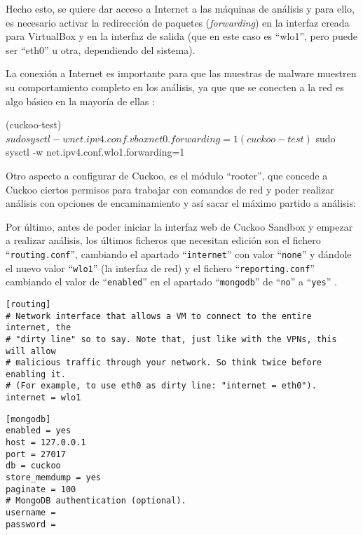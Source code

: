 Hecho esto, se quiere dar acceso a Internet a las máquinas de análisis y para ello, es necesario activar la redirección de paquetes (\textit{forwarding}) en la interfaz creada para VirtualBox y en la interfaz de salida (que en este caso es ``wlo1'', pero puede ser ``eth0'' u otra, dependiendo del sistema).

La conexión a Internet es importante para que las muestras de malware muestren su comportamiento completo en los análisis, ya que que se conecten a la red es algo básico en la mayoría de ellas \cite{HATCHING}:

\begin{listing}[style=consola, numbers=none]
(cuckoo-test) $ sudo sysctl -w net.ipv4.conf.vboxnet0.forwarding=1
(cuckoo-test) $ sudo sysctl -w net.ipv4.conf.wlo1.forwarding=1
\end{listing}

Otro aspecto a configurar de Cuckoo, es el módulo ``rooter'', que concede a Cuckoo ciertos permisos para trabajar con comandos de red y poder realizar análisis con opciones de encaminamiento y así sacar el máximo partido a análisis:


Por último, antes de poder iniciar la interfaz web de Cuckoo Sandbox y empezar a realizar análisis, los últimos ficheros que necesitan edición son el fichero ``\verb!routing.conf!'', cambiando el apartado ``\verb!internet!'' con valor ``\verb!none!'' y dándole el nuevo valor ``\verb!wlo1!'' (la interfaz de red) y el fichero ``\verb!reporting.conf!'' cambiando el valor de ``\verb!enabled!'' en el apartado ``\verb!mongodb!'' de ``\verb!no!'' a ``\verb!yes!'' \cite{HATCHING}.

\lstset{language=bash,breaklines=true, basicstyle=\footnotesize}
\begin{lstlisting}[frame=single, caption=Fichero ``routing.conf'']
[routing]
# Network interface that allows a VM to connect to the entire internet, the
# "dirty line" so to say. Note that, just like with the VPNs, this will allow
# malicious traffic through your network. So think twice before enabling it.
# (For example, to use eth0 as dirty line: "internet = eth0").
internet = wlo1
\end{lstlisting}

\lstset{language=bash,breaklines=true, basicstyle=\footnotesize}
\begin{lstlisting}[frame=single, caption=Fichero ``reporting.conf'']
[mongodb]
enabled = yes
host = 127.0.0.1
port = 27017
db = cuckoo
store_memdump = yes
paginate = 100
# MongoDB authentication (optional).
username = 
password = 
\end{lstlisting}

